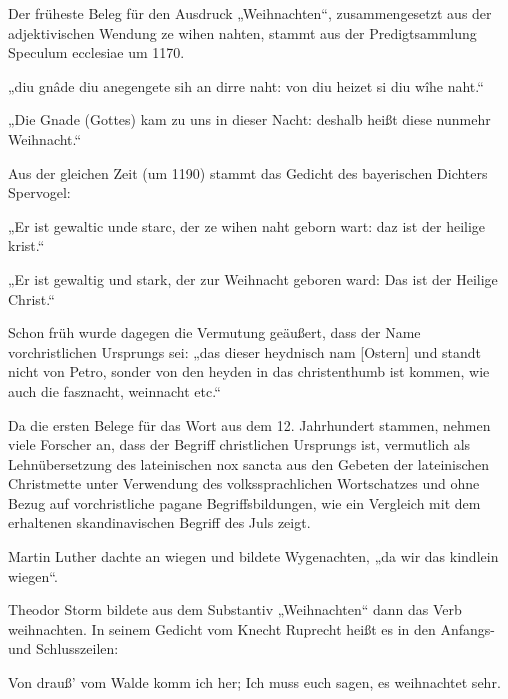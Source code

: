 Der früheste Beleg für den Ausdruck „Weihnachten“, zusammengesetzt aus der adjektivischen Wendung ze wihen nahten, stammt aus der Predigtsammlung Speculum ecclesiae um 1170.\cite{reiser}

    „diu gnâde diu anegengete sih an dirre naht: von diu heizet si diu wîhe naht.“

    „Die Gnade (Gottes) kam zu uns in dieser Nacht: deshalb heißt diese nunmehr Weihnacht.“

Aus der gleichen Zeit (um 1190) stammt das Gedicht des bayerischen Dichters Spervogel:\cite{scala}

    „Er ist gewaltic unde starc, der ze wihen naht geborn wart: daz ist der heilige krist.“

    „Er ist gewaltig und stark, der zur Weihnacht geboren ward: Das ist der Heilige Christ.“


Schon früh wurde dagegen die Vermutung geäußert, dass der Name vorchristlichen Ursprungs sei: „das dieser heydnisch nam [Ostern] und standt nicht von Petro, sonder von den heyden in das christenthumb ist kommen, wie auch die fasznacht, weinnacht etc.“

Da die ersten Belege für das Wort aus dem 12. Jahrhundert stammen, nehmen viele Forscher an, dass der Begriff christlichen Ursprungs ist, vermutlich als Lehnübersetzung des lateinischen nox sancta aus den Gebeten der lateinischen Christmette unter Verwendung des volkssprachlichen Wortschatzes und ohne Bezug auf vorchristliche pagane Begriffsbildungen, wie ein Vergleich mit dem erhaltenen skandinavischen Begriff des Juls zeigt.

Martin Luther dachte an wiegen und bildete Wygenachten‚ „da wir das kindlein wiegen“.

Theodor Storm bildete aus dem Substantiv „Weihnachten“ dann das Verb weihnachten. In seinem Gedicht vom Knecht Ruprecht heißt es in den Anfangs- und Schlusszeilen:

Von drauß’ vom Walde komm ich her;
Ich muss euch sagen, es weihnachtet sehr.




